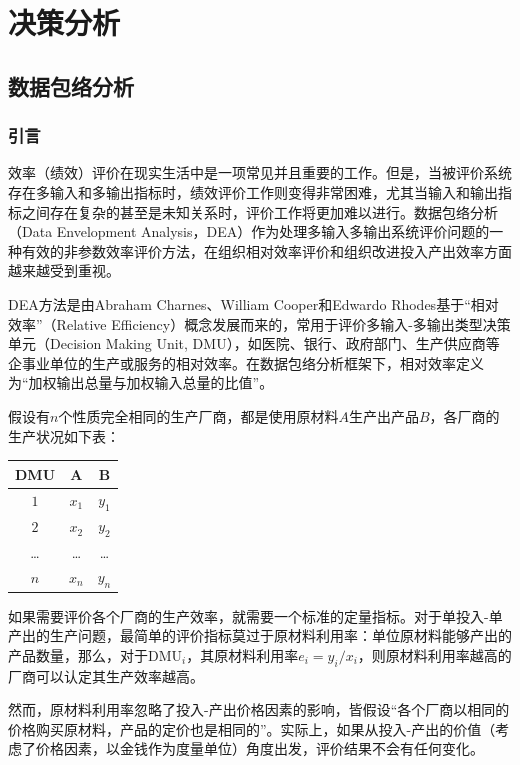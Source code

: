 \part{决策分析}
\chapter{数据包络分析}

\ornamento
\section{引言}
效率（绩效）评价在现实生活中是一项常见并且重要的工作。但是，当被评价系统存在多输入和多输出指标时，绩效评价工作则变得非常困难，尤其当输入和输出指标之间存在复杂的甚至是未知关系时，评价工作将更加难以进行。数据包络分析（Data Envelopment Analysis，DEA）作为处理多输入多输出系统评价问题的一种有效的非参数效率评价方法，在组织相对效率评价和组织改进投入产出效率方面越来越受到重视。

DEA方法是由Abraham Charnes、William Cooper和Edwardo Rhodes\cite{charnes1978dea}基于“相对效率”（Relative Efficiency）概念发展而来的，常用于评价多输入-多输出类型决策单元（Decision Making Unit, DMU），如医院、银行、政府部门、生产供应商等企事业单位的生产或服务的相对效率。在数据包络分析框架下，相对效率定义为“加权输出总量与加权输入总量的比值”。

假设有$n$个性质完全相同的生产厂商，都是使用原材料$A$生产出产品$B$，各厂商的生产状况如下表：
\begin{table}[htbp]
\centering
\begin{tabular}{|c|c|c|}
  \hline
  DMU & A & B \\
  \hline
  $1$ & $x_1$ & $y_1$ \\
  $2$ & $x_2$ & $y_2$ \\
  \ldots & \ldots& \ldots \\
  $n$ & $x_n$ & $y_n$ \\
  \hline
\end{tabular}
\end{table}

如果需要评价各个厂商的生产效率，就需要一个标准的定量指标。对于单投入-单产出的生产问题，最简单的评价指标莫过于原材料利用率：单位原材料能够产出的产品数量，那么，对于$\mathrm{DMU}_i$，其原材料利用率$e_i = y_i/x_i$，则原材料利用率越高的厂商可以认定其生产效率越高。

然而，原材料利用率忽略了投入-产出价格因素的影响，皆假设“各个厂商以相同的价格购买原材料，产品的定价也是相同的”。实际上，如果从投入-产出的价值（考虑了价格因素，以金钱作为度量单位）角度出发，评价结果不会有任何变化。

